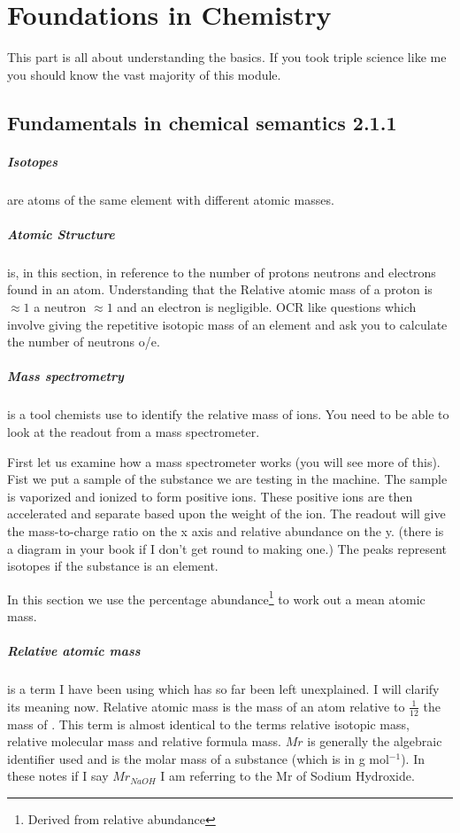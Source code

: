 \chapter{Foundations in Chemistry}
	This part is all about understanding the basics. If you took triple science like me you should know the vast majority of this module.
	
\section{Fundamentals in chemical semantics 2.1.1}
	
	\paragraph{Isotopes} are atoms of the same element with different atomic masses.
	
	\paragraph{Atomic Structure} is, in this section, in reference to the number of protons neutrons and electrons found in an atom. Understanding that the Relative atomic mass of a proton is $\approx 1$ a neutron $\approx 1$ and an electron is negligible. OCR like questions which involve giving the repetitive isotopic mass of an element and ask you to calculate the number of neutrons o/e.
	
	\paragraph{Mass spectrometry} is a tool chemists use to identify the relative mass of ions. You need to be able to look at the readout from a mass spectrometer.
	
	First let us examine how a mass spectrometer works (you will see more of this). Fist we put a sample of the substance we are testing in the machine. The sample is vaporized and ionized to form positive ions. These positive ions are then accelerated and separate based upon the weight of the ion. The readout will give the mass-to-charge ratio on the x axis and relative abundance on the y. (there is a diagram in your book if I don't get round to making one.) The peaks represent isotopes if the substance is an element.
	
	In this section we use the percentage abundance\footnote{Derived from relative abundance} to work out a mean atomic mass.
	
	\paragraph{Relative atomic mass} is a term I have been using which has so far been left unexplained. I will clarify its meaning now. Relative atomic mass is the mass of an atom relative to $\frac{1}{12}$ the mass of . This term is almost identical to the terms relative isotopic mass, relative molecular mass and relative formula mass. $Mr$ is generally the algebraic identifier used and is the molar mass of a substance (which is in g mol$^{-1}$). In these notes if I say $Mr_{NaOH}$ I am referring to the Mr of Sodium Hydroxide.
	
